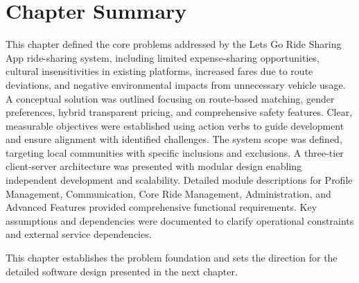 \section{Chapter Summary}

This chapter defined the core problems addressed by the Lets Go Ride Sharing App ride-sharing system, including limited expense-sharing opportunities, cultural insensitivities in existing platforms, increased fares due to route deviations, and negative environmental impacts from unnecessary vehicle usage. A conceptual solution was outlined focusing on route-based matching, gender preferences, hybrid transparent pricing, and comprehensive safety features. Clear, measurable objectives were established using action verbs to guide development and ensure alignment with identified challenges. The system scope was defined, targeting local communities with specific inclusions and exclusions. A three-tier client-server architecture was presented with modular design enabling independent development and scalability. Detailed module descriptions for Profile Management, Communication, Core Ride Management, Administration, and Advanced Features provided comprehensive functional requirements. Key assumptions and dependencies were documented to clarify operational constraints and external service dependencies.

This chapter establishes the problem foundation and sets the direction for the detailed software design presented in the next chapter.

\newpage